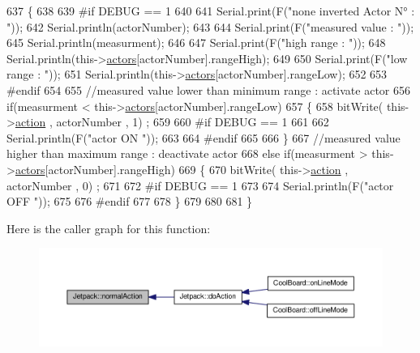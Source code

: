 \begin{DoxyCode}
637 \{
638 
639 \textcolor{preprocessor}{#if DEBUG == 1}
640     
641     Serial.print(F(\textcolor{stringliteral}{"none inverted Actor N° : "}));
642     Serial.println(actorNumber);
643 
644     Serial.print(F(\textcolor{stringliteral}{"measured value : "}));
645     Serial.println(measurment);
646 
647     Serial.print(F(\textcolor{stringliteral}{"high range : "}));
648     Serial.println(this->\hyperlink{class_jetpack_a7e16d2f97837f9712a2e6de1c50d99db}{actors}[actorNumber].rangeHigh);
649 
650     Serial.print(F(\textcolor{stringliteral}{"low range : "}));
651     Serial.println(this->\hyperlink{class_jetpack_a7e16d2f97837f9712a2e6de1c50d99db}{actors}[actorNumber].rangeLow);
652 
653 \textcolor{preprocessor}{#endif}
654 
655     \textcolor{comment}{//measured value lower than minimum range : activate actor}
656     \textcolor{keywordflow}{if}(measurment < this->\hyperlink{class_jetpack_a7e16d2f97837f9712a2e6de1c50d99db}{actors}[actorNumber].rangeLow)
657     \{
658         bitWrite( this->\hyperlink{class_jetpack_aca3142925a7b0834b34ae91d26af7765}{action} , actorNumber , 1) ;
659 
660 \textcolor{preprocessor}{    #if DEBUG == 1 }
661 
662         Serial.println(F(\textcolor{stringliteral}{"actor ON "}));
663     
664 \textcolor{preprocessor}{    #endif}
665                 
666     \}
667     \textcolor{comment}{//measured value higher than maximum range : deactivate actor}
668     \textcolor{keywordflow}{else} \textcolor{keywordflow}{if}(measurment > this->\hyperlink{class_jetpack_a7e16d2f97837f9712a2e6de1c50d99db}{actors}[actorNumber].rangeHigh)
669     \{
670         bitWrite( this->\hyperlink{class_jetpack_aca3142925a7b0834b34ae91d26af7765}{action} , actorNumber , 0) ;
671 
672 \textcolor{preprocessor}{    #if DEBUG == 1 }
673 
674         Serial.println(F(\textcolor{stringliteral}{"actor OFF "}));
675     
676 \textcolor{preprocessor}{    #endif}
677     
678     \}
679 
680 
681 \}
\end{DoxyCode}
Here is the caller graph for this function\+:\nopagebreak
\begin{figure}[H]
\begin{center}
\leavevmode
\includegraphics[width=350pt]{df/d1d/class_jetpack_a65ce9533c39fa71e4945b970bf14b980_icgraph}
\end{center}
\end{figure}
\mbox{\label{class_jetpack_ac54a7bb4f9166bee32052253d9b1d306}} 
